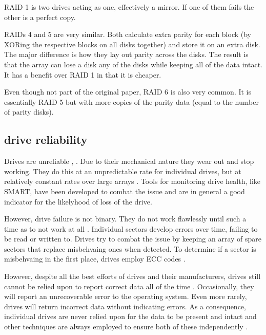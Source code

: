            RAID 1 is two drives acting as one, effectively a mirror. If one of
            them fails the other is a perfect copy.

            RAIDs 4 and 5 are very similar. Both calculate extra parity for
            each block (by XORing the respective blocks on all disks together)
            and store it on an extra disk. The major difference is how they lay
            out parity across the disks. The result is that the array can lose
            a disk any of the disks while keeping all of the data intact. It
            has a benefit over RAID 1 in that it is cheaper.

            Even though not part of the original paper, RAID 6 is also very
            common. It is essentially RAID 5 but with more copies of the parity
            data (equal to the number of parity disks).

        \subsection{drive reliability}
            \label{reliability}

            Drives are unreliable \cite{RAID}, \cite{Backblaze (idk which one)}.
            Due to their mechanical nature they wear out and stop working. They
            do this at an unpredictable rate for individual drives, but at
            relatively constant rates over large arrays \cite{Backblaze_stats}.
            Tools for monitoring drive health, like SMART, have been developed
            to combat the issue and are in general a good indicator for the
            likelyhood of loss of the drive.

            However, drive failure is not binary. They do not work flawlessly
            until such a time as to not work at all \cite{2D_RAID}. Individual
            sectors develop errors over time, failing to be read or written to.
            Drives try to combat the issue by keeping an array of spare sectors
            that replace misbehvaing ones when detected. To determine if a
            sector is misbehvaing in the first place, drives employ ECC codes
            \cite{data_corruption_storage_stack, although maybe someone else}.

            However, despite all the best efforts of drives and their
            manufacturers, drives still cannot be relied upon to report correct
            data all of the time \cite{data_corruption_storage_stack}.
            Occasionally, they will report an unrecoverable error to the
            operating system. Even more rarely, drives will return incorrect
            data without indicating errors. As a consequence, individual drives
            are never relied upon for the data to be present and intact and
            other techniques are always employed to ensure both of these
            independently \cite{LTT_data_loss?}.

